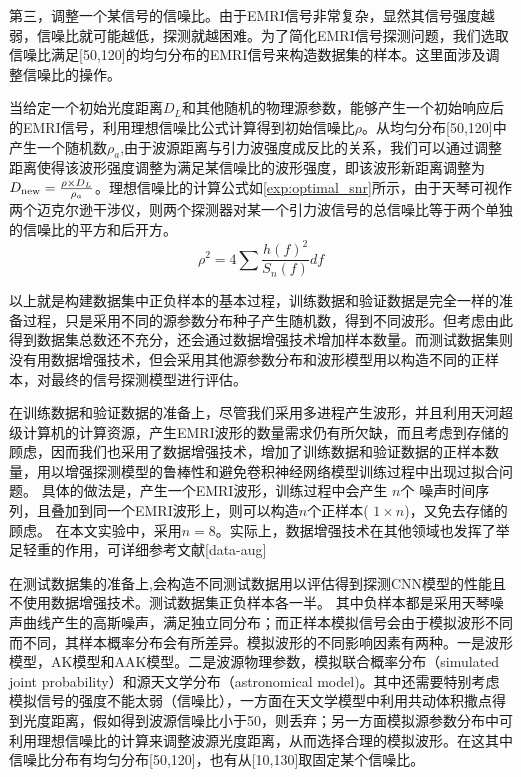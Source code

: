 第三，调整一个某信号的信噪比。由于EMRI信号非常复杂，显然其信号强度越弱，信噪比就可能越低，探测就越困难。为了简化EMRI信号探测问题，我们选取信噪比满足[50,120]的均匀分布的EMRI信号来构造数据集的样本。这里面涉及调整信噪比的操作。

当给定一个初始光度距离$D_L$和其他随机的物理源参数，能够产生一个初始响应后的EMRI信号，利用理想信噪比公式计算得到初始信噪比$\rho$。从均匀分布[50,120]中产生一个随机数$\rho_a$,由于波源距离与引力波强度成反比的关系，我们可以通过调整距离使得该波形强度调整为满足某信噪比的波形强度，即该波形新距离调整为$D_{\rm new}=\frac{\rho \times D_L}{\rho_a}$。理想信噪比的计算公式如\ref{exp:optimal_snr}所示，由于天琴可视作两个迈克尔逊干涉仪，则两个探测器对某一个引力波信号的总信噪比等于两个单独的信噪比的平方和后开方。
\begin{equation}\label{exp:optimal_snr}
\rho^2 = 4 \sum \frac{h(f)^2}{S_n(f)} df
\end{equation}

以上就是构建数据集中正负样本的基本过程，训练数据和验证数据是完全一样的准备过程，只是采用不同的源参数分布种子产生随机数，得到不同波形。但考虑由此得到数据集总数还不充分，还会通过数据增强技术增加样本数量。而测试数据集则没有用数据增强技术，但会采用其他源参数分布和波形模型用以构造不同的正样本，对最终的信号探测模型进行评估。


在训练数据和验证数据的准备上，尽管我们采用多进程产生波形，并且利用天河超级计算机的计算资源，产生EMRI波形的数量需求仍有所欠缺，而且考虑到存储的顾虑，因而我们也采用了数据增强技术，增加了训练数据和验证数据的正样本数量，用以增强探测模型的鲁棒性和避免卷积神经网络模型训练过程中出现过拟合问题。
具体的做法是，产生一个EMRI波形，训练过程中会产生 $n$个 噪声时间序列，且叠加到同一个EMRI波形上，则可以构造$n$个正样本(
$1\times n$)，又免去存储的顾虑。
在本文实验中，采用$n=8$。实际上，数据增强技术在其他领域也发挥了举足轻重的作用，可详细参考文献[data-aug]

在测试数据集的准备上,会构造不同测试数据用以评估得到探测CNN模型的性能且不使用数据增强技术。测试数据集正负样本各一半。
其中负样本都是采用天琴噪声曲线产生的高斯噪声，满足独立同分布；而正样本模拟信号会由于模拟波形不同而不同，其样本概率分布会有所差异。模拟波形的不同影响因素有两种。一是波形模型，AK模型和AAK模型。二是波源物理参数，模拟联合概率分布（simulated joint probability）和源天文学分布（astronomical model)。其中还需要特别考虑模拟信号的强度不能太弱（信噪比），一方面在天文学模型中利用共动体积撒点得到光度距离，假如得到波源信噪比小于50，则丢弃；另一方面模拟源参数分布中可利用理想信噪比的计算来调整波源光度距离，从而选择合理的模拟波形。在这其中信噪比分布有均匀分布[50,120]，也有从[10,130]取固定某个信噪比。

